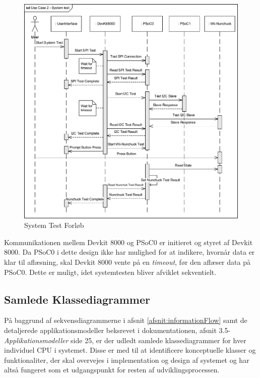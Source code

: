 \begin{figure}[H]
	\centering
	\includegraphics[width=\textwidth] {Systemarkitektur/images/SequenceDiagramUC2}
	\caption{System Test Forløb}
	\label{fig:SystemTestSekvensDiagram}
\end{figure}

\noindent Kommunikationen mellem Devkit 8000 og PSoC0 er initieret og styret af Devkit 8000. Da PSoC0 i dette design ikke har mulighed for at indikere, hvornår data er klar til aflæsning, skal Devkit 8000 vente på en \textit{timeout}, før den aflæser data på PSoC0. Dette er muligt, idet systemtesten bliver afviklet sekventielt.

\subsection{Samlede Klassediagrammer}
\label{afsnit:samledeKlasser}
På baggrund af sekvensdiagrammerne i afsnit \ref{afsnit:informationFlow} samt de detaljerede applikationsmodeller beksrevet i dokumentationen, afsnit 3.5-\textit{Applikationsmodeller} side 25, er der udledt samlede klassediagrammer for hver individuel CPU i systemet. Disse er med til at identificere konceptuelle klasser og funktionaliter, der skal overvejes i implementation og design af systemet og har altså fungeret som et udgangspunkt for resten af udviklingsprocessen. \newline

